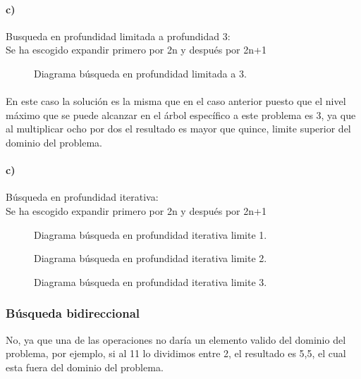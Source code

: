 \documentclass[a4paper,10pt]{article}
\newcommand\tab[1][1cm]{\hspace*{#1}}
\begin{document}
\paragraph{c)}Busqueda en profundidad limitada a profundidad 3:\\
\tab Se ha escogido expandir primero por 2n y después por 2n+1
\begin{figure}[hbt]
  \centering
	\scalebox{0.7}{}
	\caption{Diagrama búsqueda en profundidad limitada a 3.}
	\label{fig:busqueda_profundidad_limitada}
\end{figure}
\paragraph{}
En este caso la solución es la misma que en el caso anterior puesto que el nivel máximo que se puede alcanzar en el árbol específico a este problema es 3, ya que al multiplicar ocho por dos el resultado es mayor que quince, limite superior del dominio del problema.
\pagebreak

\paragraph{c)}Búsqueda en profundidad iterativa:\\
\tab Se ha escogido expandir primero por 2n y después por 2n+1
\begin{figure}[hbt]
  \centering
	\scalebox{0.7}{}
	\caption{Diagrama búsqueda en profundidad iterativa limite 1.}
	\label{fig:busqueda_profundidad_iterativa_1}
\end{figure}
\begin{figure}[hbt]
  \centering
	\scalebox{0.7}{}
	\caption{Diagrama búsqueda en profundidad iterativa limite 2.}
	\label{fig:busqueda_profundidad_iterativa_2}
\end{figure}
\begin{figure}[hbt]
  \centering
	\scalebox{0.7}{}
	\caption{Diagrama búsqueda en profundidad iterativa limite 3.}
	\label{fig:busqueda_profundidad_iterativa_3}
\end{figure}
\pagebreak

\subsubsection{Búsqueda bidireccional}
No, ya que una de las operaciones no daría un elemento valido del dominio del problema, por ejemplo, si al 11 lo dividimos entre 2, el resultado es 5,5, el cual esta fuera del dominio del problema.
\end{document}
